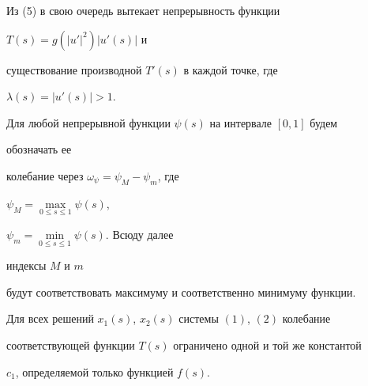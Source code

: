 Из (5) в свою очередь вытекает непрерывность функции 


$T(s)=g(|u'|^2)|u'(s)|$ и 


существование производной $T'(s)$ в каждой точке, где 


$\lambda(s)=|u'(s)|>1$. 


 


Для любой непрерывной функции $\psi(s)$ на интервале $[0,1]$ будем 


обозначать ее 


колебание через $\omega_\psi=\psi_M-\psi_m$, где 


$\psi_M=\max\limits_{0\le s\le 1}\psi(s)$, 


$\psi_m=\min\limits_{0\le s\le 1}\psi(s)$. Всюду далее 


индексы $M$ и $m$ 


будут соответствовать максимуму и соответственно минимуму функции. 


 


\begin{lem} 


Для всех решений $x_1(s)$, $x_2(s)$ системы $(1)$, $(2)$ колебание 


соответствующей функции $T(s)$ ограничено одной и той же константой 


$c_1$, определяемой только функцией $f(s)$. 


\end{lem} 


 


